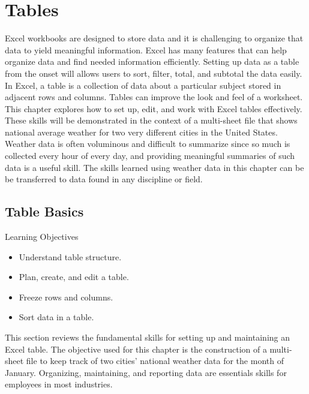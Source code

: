 \chapter{Tables}\label{ch05:tables}

Excel workbooks are designed to store data and it is challenging to organize that data to yield meaningful information. Excel has many features that can help organize data and find needed information efficiently. Setting up data as a table from the onset will allows users to sort, filter, total, and subtotal the data easily. In Excel, a table is a collection of data about a particular subject stored in adjacent rows and columns. Tables can improve the look and feel of a worksheet. This chapter explores how to set up, edit, and work with Excel tables effectively. These skills will be demonstrated in the context of a multi-sheet file that shows national average weather for two very different cities in the United States. Weather data is often voluminous and difficult to summarize since so much is collected every hour of every day, and providing meaningful summaries of such data is a useful skill. The skills learned using weather data in this chapter can be be transferred to data found in any discipline or field.

\section{Table Basics}

\begin{center}
	\begin{objbox}{Learning Objectives}
		\begin{itemize}
			\setlength{\itemsep}{0pt}
			\setlength{\parskip}{0pt}
			\setlength{\parsep}{0pt}
			
			\item Understand table structure.
			\item Plan, create, and edit a table.
			\item Freeze rows and columns.
			\item Sort data in a table.
		\end{itemize}
	\end{objbox}
\end{center}

This section reviews the fundamental skills for setting up and maintaining an Excel table. The objective used for this chapter is the construction of a multi-sheet file to keep track of two cities' national weather data for the month of January. Organizing, maintaining, and reporting data are essentials skills for employees in most industries.

